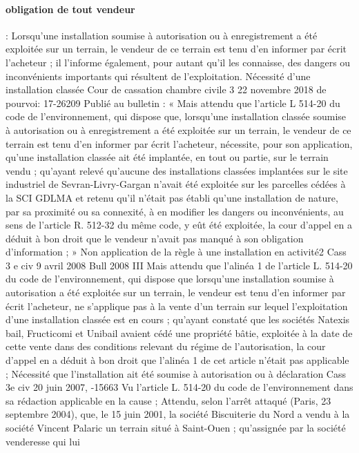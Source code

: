 \documentclass[11pt,a4paper]{report}
\begin{document}
	\paragraph{obligation de tout vendeur} : Lorsqu'une installation soumise à autorisation ou à enregistrement a été
	exploitée sur un terrain, le vendeur de ce terrain est tenu d'en informer par écrit l'acheteur ; il l'informe
	également, pour autant qu'il les connaisse, des dangers ou inconvénients importants qui résultent de
	l'exploitation.
	Nécessité d’une installation classée
	Cour de cassation chambre civile 3 22 novembre 2018 \No de pourvoi: 17-26209 Publié au bulletin : « Mais
	attendu que l'article L 514-20 du code de l'environnement, qui dispose que, lorsqu'une installation classée
	soumise à autorisation ou à enregistrement a été exploitée sur un terrain, le vendeur de ce terrain est tenu d'en
	informer par écrit l'acheteur, nécessite, pour son application, qu'une installation classée ait été implantée, en
	tout ou partie, sur le terrain vendu ; qu'ayant relevé qu'aucune des installations classées implantées sur le site
	industriel de Sevran-Livry-Gargan n'avait été exploitée sur les parcelles cédées à la SCI GDLMA et retenu qu'il
	n'était pas établi qu'une installation de nature, par sa proximité ou sa connexité, à en modifier les dangers ou
	inconvénients, au sens de l'article R. 512-32 du même code, y eût été exploitée, la cour d'appel en a déduit à bon
	droit que le vendeur n'avait pas manqué à son obligation d'information ; »
	Non application de la règle à une installation en activité2
	Cass 3 e civ 9 avril 2008 Bull 2008 III 
	Mais attendu que l'alinéa 1 de l'article L. 514-20 du code de l'environnement, qui dispose que lorsqu'une
	installation soumise à autorisation a été exploitée sur un terrain, le vendeur est tenu d'en informer par écrit
	l'acheteur, ne s'applique pas à la vente d'un terrain sur lequel l'exploitation d'une installation classée est en
	cours ; qu'ayant constaté que les sociétés Natexis bail, Fructicomi et Unibail avaient cédé une propriété bâtie,
	exploitée à la date de cette vente dans des conditions relevant du régime de l'autorisation, la cour d'appel en a
	déduit à bon droit que l'alinéa 1 de cet article n'était pas applicable ;
	Nécessité que l’installation ait été soumise à autorisation ou à déclaration
	Cass 3e civ 20 juin 2007, -15663
	Vu l'article L. 514-20 du code de l'environnement dans sa rédaction applicable en la cause ;
	Attendu, selon l'arrêt attaqué (Paris, 23 septembre 2004), que, le 15 juin 2001, la société Biscuiterie du Nord a
	vendu à la société Vincent Palaric un terrain situé à Saint-Ouen ; qu'assignée par la société venderesse qui lui
\end{document}
